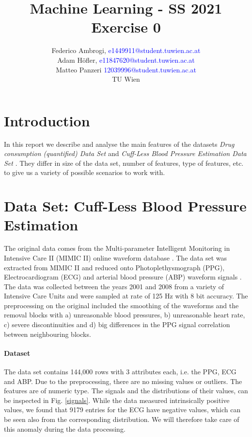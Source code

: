\documentclass{article}
\begin{document}
\title{ Machine Learning - SS 2021 \\ Exercise 0 }


	\author{Federico Ambrogi, \textcolor{blue} {e1449911@student.tuwien.ac.at } \\
	Adam Höfler, \textcolor{blue} {e11847620@student.tuwien.ac.at } \\
	Matteo Panzeri \textcolor{blue}{12039996@student.tuwien.ac.at } \\
    TU Wien }






\maketitle
\setcounter{tocdepth}{2}
\tableofcontents

\section*{Introduction}
In this report we describe and analyse the main features of the datasets \textit{Drug consumption (quantified) Data Set
}\cite{DrugConsumption} and \textit{Cuff-Less Blood Pressure Estimation Data Set} \cite{BloodPressure}.
They differ in size of the data set, number of features, type of features, etc. to give us a variety of possible scenarios to work with.

\section{Data Set: Cuff-Less Blood Pressure Estimation}
The original data comes from the Multi-parameter Intelligent Monitoring in Intensive Care II (MIMIC II) online waveform database \cite{BloodPressureDatabase}\cite{Goldberger2000PhysioBankPA}. The data set was extracted from MIMIC II and reduced onto Photoplethysmograph (PPG), Electrocardiogram (ECG) and arterial blood pressure (ABP) waveform signals \cite{Kachuee2015CufflessHC}. The data was collected between the years 2001 and 2008 from a variety of Intensive Care Units and were sampled at rate of 125 Hz with 8 bit accuracy. The preprocessing on the original included the smoothing of the waveforms and the removal blocks with a) unreasonable blood pressures, b) unreasonable heart rate, c) severe discontinuities and d) big differences in the PPG signal correlation between neighbouring blocks.

\paragraph{Dataset}
\noindent The data set contains 144,000 rows with 3 attributes each, i.e. the PPG, ECG and ABP. Due to the preprocessing, there are no missing values or outliers. The features are of numeric type. The signals and the distributions of their values, can be inspected in Fig. \ref{signals}. While the data measured intrinsically positive values, we found that 9179 entries for the ECG have negative values, which can be seen also from the corresponding distribution. We will therefore take care of this anomaly during the data processing. 
\end{document}

